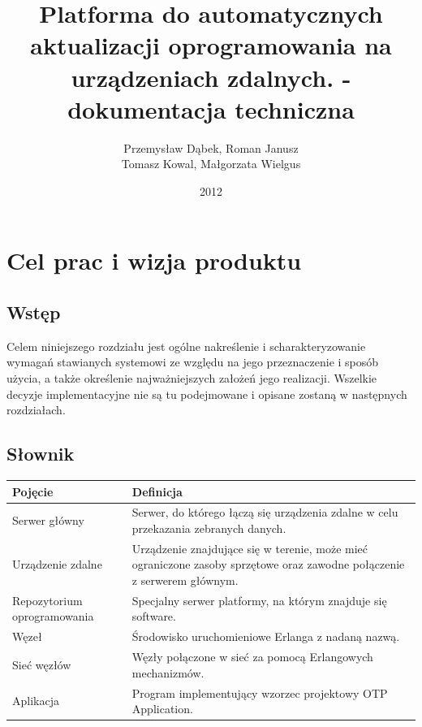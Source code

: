 \documentclass[polish,12pt]{aghthesis}
\author{Przemysław Dąbek, Roman Janusz\\ Tomasz Kowal, Małgorzata Wielgus}
\title{Platforma do automatycznych aktualizacji oprogramowania na urządzeniach zdalnych. - dokumentacja techniczna}
\date{2012}
\begin{document}
\maketitle

\tableofcontents
\clearpage



\section{Cel prac i wizja produktu}
\label{sec:cel-wizja}
\subsection{Wstęp}
Celem niniejszego rozdziału jest ogólne nakreślenie i scharakteryzowanie wymagań stawianych systemowi ze względu na jego przeznaczenie i sposób użycia, a także określenie najważniejszych założeń jego realizacji.
Wszelkie decyzje implementacyjne nie są tu podejmowane i opisane zostaną w następnych rozdziałach.
\subsection{Słownik}
\begin{tabular}{| l | p{9cm} |}
  \hline
  Pojęcie & Definicja \\ \hline
  Serwer główny & Serwer, do którego łączą się urządzenia zdalne w celu przekazania zebranych danych.\\ \hline
  Urządzenie zdalne & Urządzenie znajdujące się w terenie, może mieć ograniczone zasoby sprzętowe oraz zawodne połączenie z serwerem głównym.\\ \hline
  Repozytorium oprogramowania & Specjalny serwer platformy, na którym znajduje się software.\\ \hline
  Węzeł & Środowisko uruchomieniowe Erlanga z nadaną nazwą.\\ \hline
  Sieć węzłów & Węzły połączone w sieć za pomocą Erlangowych mechanizmów.\\ \hline
  Aplikacja & Program implementujący wzorzec projektowy OTP Application. \\ \hline
\end{tabular}
\end{document}
